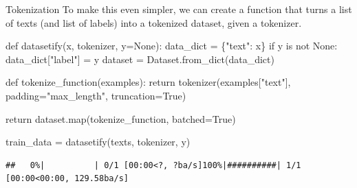 \documentclass[
  10pt,
  ignorenonframetext,
  aspectratio=169]{beamer}
\newenvironment{Shaded}{\begin{snugshade}}{\end{snugshade}}
\newcommand{\BuiltInTok}[1]{\textcolor[rgb]{0.80,0.80,0.80}{#1}}
\newcommand{\ControlFlowTok}[1]{\textcolor[rgb]{0.94,0.87,0.69}{#1}}
\newcommand{\KeywordTok}[1]{\textcolor[rgb]{0.94,0.87,0.69}{#1}}
\newcommand{\NormalTok}[1]{\textcolor[rgb]{0.80,0.80,0.80}{#1}}
\newcommand{\OperatorTok}[1]{\textcolor[rgb]{0.94,0.94,0.82}{#1}}
\newcommand{\StringTok}[1]{\textcolor[rgb]{0.80,0.58,0.58}{#1}}
\newcommand{\VariableTok}[1]{\textcolor[rgb]{0.80,0.80,0.80}{#1}}
\begin{document}
\begin{frame}[fragile]{Tokenization}
\protect\hypertarget{tokenization-1}{}
To make this even simpler, we can create a function that turns a list of
texts (and list of labels) into a tokenized dataset, given a tokenizer.

\medskip
\scriptsize

\begin{Shaded}
\begin{Highlighting}[]
\KeywordTok{def}\NormalTok{ datasetify(x, tokenizer, y}\OperatorTok{=}\VariableTok{None}\NormalTok{):}
\NormalTok{    data\_dict }\OperatorTok{=}\NormalTok{ \{}\StringTok{"text"}\NormalTok{: x\}}
    \ControlFlowTok{if}\NormalTok{ y }\KeywordTok{is} \KeywordTok{not} \VariableTok{None}\NormalTok{:}
\NormalTok{        data\_dict[}\StringTok{"label"}\NormalTok{] }\OperatorTok{=}\NormalTok{ y}
\NormalTok{    dataset }\OperatorTok{=}\NormalTok{ Dataset.from\_dict(data\_dict)}

    \KeywordTok{def}\NormalTok{ tokenize\_function(examples):}
        \ControlFlowTok{return}\NormalTok{ tokenizer(examples[}\StringTok{"text"}\NormalTok{], padding}\OperatorTok{=}\StringTok{"max\_length"}\NormalTok{, truncation}\OperatorTok{=}\VariableTok{True}\NormalTok{)}

    \ControlFlowTok{return}\NormalTok{ dataset.}\BuiltInTok{map}\NormalTok{(tokenize\_function, batched}\OperatorTok{=}\VariableTok{True}\NormalTok{)}
  
\NormalTok{train\_data }\OperatorTok{=}\NormalTok{ datasetify(texts, tokenizer, y)}
\end{Highlighting}
\end{Shaded}

\begin{verbatim}
##   0%|          | 0/1 [00:00<?, ?ba/s]100%|##########| 1/1 [00:00<00:00, 129.58ba/s]
\end{verbatim}
\end{frame}
\end{document}
